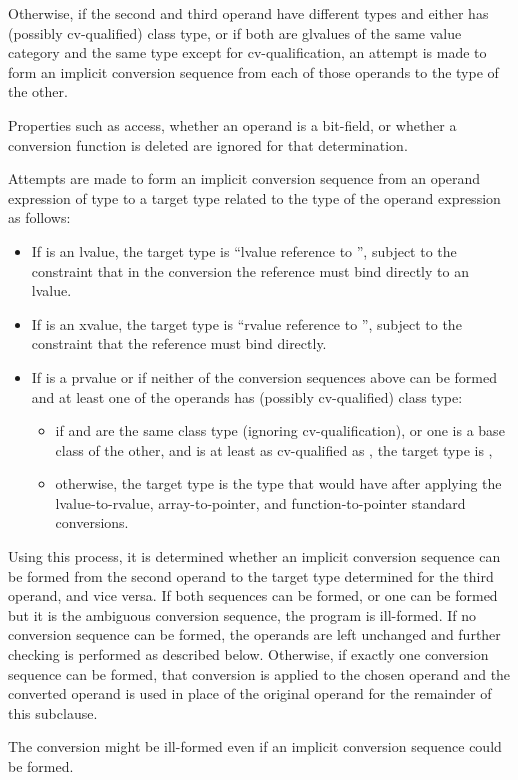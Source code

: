 \pnum
Otherwise, if the second and third operand have different types and
either has (possibly cv-qualified) class type, or if both
are glvalues of the same value category and the same type except for
cv-qualification, an attempt is made to
form an implicit conversion sequence from
each of those operands to the type of the other.
\begin{note}
Properties such as access, whether an operand is a bit-field, or whether
a conversion function is deleted are ignored for that determination.
\end{note}
Attempts are made to form an implicit conversion sequence
from an operand expression  of type 
to a target type related to the type 
of the operand expression  as follows:

\begin{itemize}
\item If  is an lvalue, the target type is
``lvalue reference to '', subject to the
constraint that in the conversion the reference must bind
directly to an lvalue.

\item If  is an xvalue, the target type is
``rvalue reference to '',
subject to the constraint that the reference must bind directly.

\item If  is a prvalue or if neither of the conversion sequences above can be
formed and at least one of the operands has (possibly cv-qualified) class type:

\begin{itemize}
\item if  and  are the same class type
(ignoring cv-qualification), or one is a base class of the other, and
 is at least as cv-qualified as ,
the target type is ,

\item otherwise, the target type is the type that  would have
after applying the
lvalue-to-rvalue,
array-to-pointer, and
function-to-pointer
standard conversions.
\end{itemize}
\end{itemize}

Using this process, it is determined whether an implicit conversion
sequence can be formed from the second operand
to the target type determined for the third operand, and vice versa.
If both sequences can be formed, or one can be formed but it is the
ambiguous conversion sequence, the program is ill-formed.
If no conversion sequence can be formed, the operands are left unchanged
and further checking is performed as described below.
Otherwise, if exactly one conversion sequence can be formed,
that conversion is applied to the chosen operand
and the converted operand is used in place of the original operand for
the remainder of this subclause.
\begin{note}
The conversion might be ill-formed even if an implicit conversion
sequence could be formed.
\end{note}

